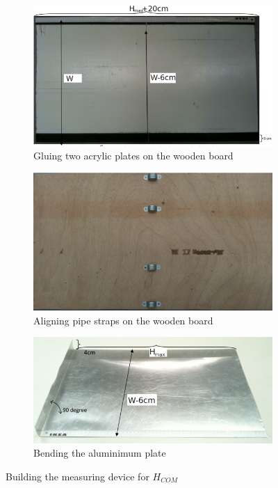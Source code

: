 {\begin{figure}[htb]
  \centering
  \begin{subfigure}{.45\textwidth}
    \includegraphics[width=\textwidth]{img/com-device-step1}
    \caption{Gluing two acrylic plates on the wooden board}
    \label{fig:gluing-acrylic-plates}
  \end{subfigure}
  \hfill
  \begin{subfigure}{.45\textwidth}
    \includegraphics[width=\textwidth]{img/com-device-step2}
    \caption{Aligning pipe straps on the wooden board}
    \label{fig:aligning-pipe-straps}
  \end{subfigure}
  \begin{subfigure}{.45\textwidth}
    \centering
    \includegraphics[width=\textwidth]{img/com-device-step3}
    \caption{Bending the aluminimum plate}
    \label{fig:bending-aluminium-plate}
  \end{subfigure}
  \caption{Building the measuring device for $H_{COM}$}
\end{figure}

}
